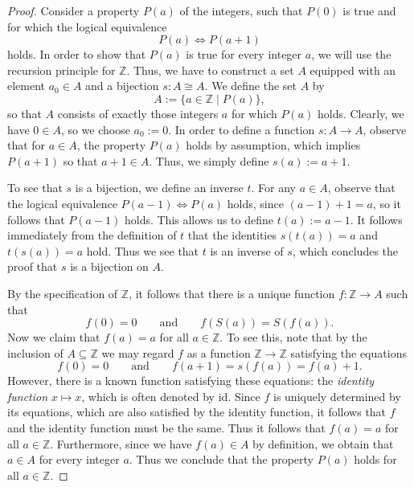 \begin{proof}
  Consider a property $P(a)$ of the integers, such that $P(0)$ is true and for which the logical equivalence
  \begin{equation*}
    P(a)\Leftrightarrow P(a+1)
  \end{equation*}
  holds. In order to show that $P(a)$ is true for every integer $a$, we will use the recursion principle for $\mathbb{Z}$. Thus, we have to construct a set $A$ equipped with an element $a_0\in A$ and a bijection $s:A\cong A$. We define the set $A$ by
  \begin{equation*}
    A := \{a\in\mathbb{Z}\mid P(a)\},
  \end{equation*}
  so that $A$ consists of exactly those integers $a$ for which $P(a)$ holds. Clearly, we have $0\in A$, so we choose $a_0:=0$. In order to define a function $s:A\to A$, observe that for $a\in A$, the property $P(a)$ holds by assumption, which implies $P(a+1)$ so that $a+1\in A$. Thus, we simply define $s(a):=a+1$.

  To see that $s$ is a bijection, we define an inverse $t$. For any $a\in A$, observe that the logical equivalence $P(a-1)\Leftrightarrow P(a)$ holds, since $(a-1)+1=a$, so it follows that $P(a-1)$ holds. This allows us to define $t(a):=a-1$. It follows immediately from the definition of $t$ that the identities $s(t(a))=a$ and $t(s(a))=a$ hold. Thus we see that $t$ is an inverse of $s$, which concludes the proof that $s$ is a bijection on $A$.

  By the specification of $\mathbb{Z}$, it follows that there is a unique function $f:\mathbb{Z}\to A$ such that
  \begin{equation*}
    f(0)=0\qquad\text{and}\qquad f(S(a))=S(f(a)).
  \end{equation*}
  Now we claim that $f(a)=a$ for all $a\in\mathbb{Z}$. To see this, note that by the inclusion of $A\subseteq \mathbb{Z}$ we may regard $f$ as a function $\mathbb{Z}\to\mathbb{Z}$ satisfying the equations
  \begin{equation*}
    f(0)=0\qquad\text{and}\qquad f(a+1)=s(f(a))=f(a)+1.
  \end{equation*}
  However, there is a known function satisfying these equations: the \emph{identity function} $x\mapsto x$, which is often denoted by $\mathrm{id}$. Since $f$ is uniquely determined by its equations, which are also satisfied by the identity function, it follows that $f$ and the identity function must be the same. Thus it follows that $f(a)=a$ for all $a\in\mathbb{Z}$. Furthermore, since we have $f(a)\in A$ by definition, we obtain that $a\in A$ for every integer $a$. Thus we conclude that the property $P(a)$ holds for all $a\in\mathbb{Z}$.
\end{proof}

